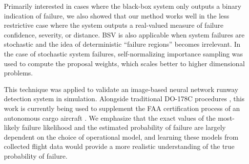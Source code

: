 Primarily interested in cases where the black-box system only outputs a binary indication of failure, we also showed that our method works well in the less restrictive case where the system outputs a real-valued measure of failure confidence, severity, or distance.
BSV is also applicable when system failures are stochastic and the idea of deterministic ``failure regions'' becomes irrelevant.
In the case of stochastic system failures, self-normalizing importance sampling was used to compute the proposal weights, which scales better to higher dimensional problems.

This technique was applied to validate an image-based neural network runway detection system in simulation.
Alongside traditional DO-178C procedures \cite{do178c}, this work is currently being used to supplement the FAA certification process of an autonomous cargo aircraft \cite{durand2023formal}.
We emphasize that the exact values of the most-likely failure likelihood and the estimated probability of failure are largely dependent on the choice of operational model, and learning these models from collected flight data would provide a more realistic understanding of the true probability of failure.
